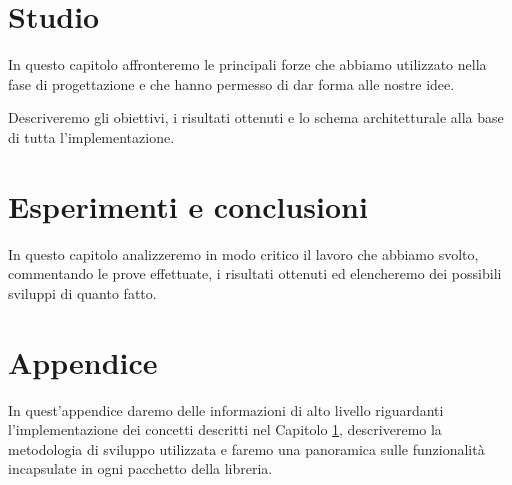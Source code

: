 \documentclass[twoside,openright,titlepage,fleqn,
	headinclude,11pt,a4paper,BCOR5mm,footinclude
	]{scrbook}
\begin{document}
\frenchspacing
\raggedbottom
{}
\pagestyle{plain}

\pagestyle{scrheadings}

\lstset{
	language = java
	, numbers = left 
	, basicstyle=\sffamily%
	, tabsize=2
	, captionpos=b
	, breaklines=true
	, showspaces=false
	, showstringspaces=false
}

\tableofcontents

% 

% 

% 
\newpage




\chapter{Studio}
\label{chapter:study}

In questo capitolo affronteremo le principali forze che abbiamo
utilizzato nella fase di progettazione e che hanno permesso di dar
forma alle nostre idee.

Descriveremo gli obiettivi, i risultati ottenuti e lo schema
architetturale alla base di tutta l'implementazione.

% 

% 



\chapter{Esperimenti e conclusioni}
In questo capitolo analizzeremo in modo critico il lavoro che abbiamo
svolto, commentando le prove effettuate, i risultati ottenuti ed
elencheremo dei possibili sviluppi di quanto fatto.
\label{chapter:conclusions}



\chapter{Appendice}
\label{chapter:implementation}
In quest'appendice daremo delle informazioni di alto livello
riguardanti l'implementazione dei concetti descritti nel Capitolo
\ref{chapter:study}, descriveremo la metodologia di sviluppo
utilizzata e faremo una panoramica sulle funzionalit\`a incapsulate in
ogni pacchetto della libreria.
\end{document}
